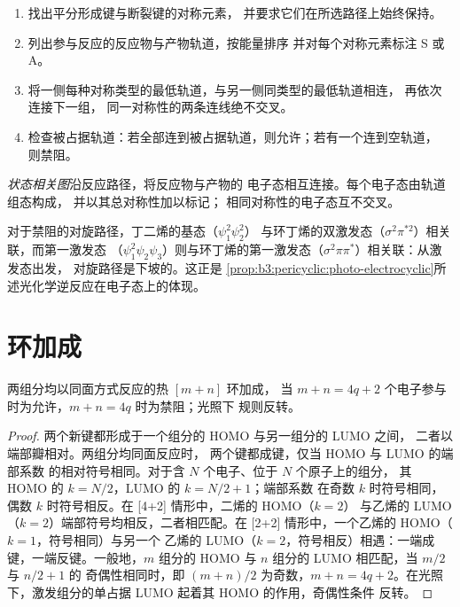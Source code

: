 \begin{method}[绘制相关图]\label{met:b3:pericyclic:correlation-diagram}
\begin{enumerate}
  \item 找出平分形成键与断裂键的对称元素，
        并要求它们在所选路径上始终保持。
  \item 列出参与反应的反应物与产物轨道，按能量排序
        并对每个对称元素标注 S 或 A。
  \item 将一侧每种对称类型的最低轨道，与另一侧同类型的最低轨道相连，
        再依次连接下一组，
        同一对称性的两条连线绝不交叉。
  \item 检查被占据轨道：若全部连到被占据轨道，则允许；若有一个连到空轨道，
        则禁阻。
\end{enumerate}
\end{method}

\begin{definition}[状态相关图]\label{def:b3:pericyclic:state-correlation}
\emph{状态相关图}沿反应路径，将反应物与产物的
电子态相互连接。每个电子态由轨道组态构成，
并以其总对称性加以标记；
相同对称性的电子态互不交叉。
\end{definition}

对于禁阻的对旋路径，丁二烯的基态（$\psi_1^2\psi_2^2$）
与环丁烯的双激发态（$\sigma^2\pi^{*2}$）相关联，而第一激发态
（$\psi_1^2\psi_2\psi_3$）则与环丁烯的第一激发态（$\sigma^2\pi\pi^*$）相关联：从激发态出发，
对旋路径是下坡的。这正是
\cref{prop:b3:pericyclic:photo-electrocyclic}所述光化学逆反应在电子态上的体现。

\section{环加成}

\begin{theorem}[环加成]\label{thm:b3:pericyclic:cycloaddition}
两组分均以同面方式反应的热 $[m + n]$ 环加成，
当 $m + n = 4q + 2$ 个电子参与时为允许，$m + n = 4q$ 时为禁阻；光照下
规则反转。
\end{theorem}

\begin{proof}
两个新键都形成于一个组分的 HOMO 与另一组分的 LUMO 之间，
二者以端部瓣相对。两组分均同面反应时，
两个键都成键，仅当 HOMO 与 LUMO 的端部系数
的相对符号相同。对于含 $N$ 个电子、位于 $N$ 个原子上的组分，
其 HOMO 的 $k = N/2$，LUMO 的 $k = N/2 + 1$；端部系数
在奇数 $k$ 时符号相同，偶数 $k$ 时符号相反。在 [4+2] 情形中，二烯的 HOMO（$k = 2$）
与乙烯的 LUMO（$k = 2$）端部符号均相反，二者相匹配。在
[2+2] 情形中，一个乙烯的 HOMO（$k = 1$，符号相同）与另一个
乙烯的 LUMO（$k = 2$，符号相反）相遇：一端成键，一端反键。一般地，$m$ 组分的 HOMO
与 $n$ 组分的 LUMO 相匹配，当 $m/2$ 与 $n/2 + 1$ 的
奇偶性相同时，即 $(m + n)/2$ 为奇数，$m + n = 4q + 2$。在光照下，激发组分的单占据 LUMO
起着其 HOMO 的作用，奇偶性条件
反转。
\end{proof}

